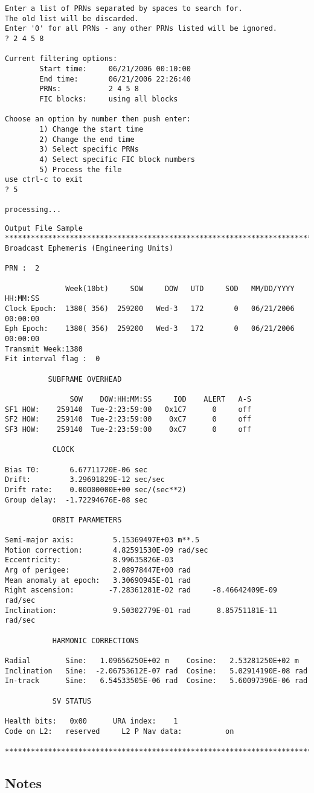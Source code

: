 \begin{\outputsize}
\begin{Verbatim}
Enter a list of PRNs separated by spaces to search for.
The old list will be discarded.
Enter '0' for all PRNs - any other PRNs listed will be ignored.
? 2 4 5 8

Current filtering options:
        Start time:     06/21/2006 00:10:00
        End time:       06/21/2006 22:26:40
        PRNs:           2 4 5 8
        FIC blocks:     using all blocks

Choose an option by number then push enter:
        1) Change the start time
        2) Change the end time
        3) Select specific PRNs
        4) Select specific FIC block numbers
        5) Process the file
use ctrl-c to exit
? 5

processing...
\end{Verbatim}
\begin{Verbatim}
Output File Sample
****************************************************************************
Broadcast Ephemeris (Engineering Units)

PRN :  2

              Week(10bt)     SOW     DOW   UTD     SOD   MM/DD/YYYY   HH:MM:SS
Clock Epoch:  1380( 356)  259200   Wed-3   172       0   06/21/2006   00:00:00
Eph Epoch:    1380( 356)  259200   Wed-3   172       0   06/21/2006   00:00:00
Transmit Week:1380
Fit interval flag :  0

          SUBFRAME OVERHEAD

               SOW    DOW:HH:MM:SS     IOD    ALERT   A-S
SF1 HOW:    259140  Tue-2:23:59:00   0x1C7      0     off
SF2 HOW:    259140  Tue-2:23:59:00    0xC7      0     off
SF3 HOW:    259140  Tue-2:23:59:00    0xC7      0     off

           CLOCK

Bias T0:       6.67711720E-06 sec
Drift:         3.29691829E-12 sec/sec
Drift rate:    0.00000000E+00 sec/(sec**2)
Group delay:  -1.72294676E-08 sec

           ORBIT PARAMETERS

Semi-major axis:         5.15369497E+03 m**.5
Motion correction:       4.82591530E-09 rad/sec
Eccentricity:            8.99635826E-03
Arg of perigee:          2.08978447E+00 rad
Mean anomaly at epoch:   3.30690945E-01 rad
Right ascension:        -7.28361281E-02 rad     -8.46642409E-09 rad/sec
Inclination:             9.50302779E-01 rad      8.85751181E-11 rad/sec

           HARMONIC CORRECTIONS

Radial        Sine:   1.09656250E+02 m    Cosine:   2.53281250E+02 m
Inclination   Sine:  -2.06753612E-07 rad  Cosine:   5.02914190E-08 rad
In-track      Sine:   6.54533505E-06 rad  Cosine:   5.60097396E-06 rad

           SV STATUS

Health bits:   0x00      URA index:    1
Code on L2:   reserved     L2 P Nav data:          on

****************************************************************************
\end{Verbatim}
\end{\outputsize}
\subsection{Notes}

%

